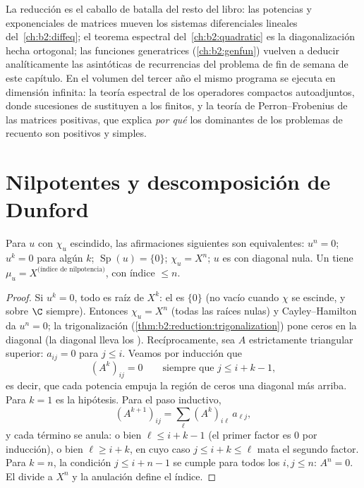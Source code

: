\begin{remark}
La reducción es el caballo de batalla del resto del libro: las
potencias y exponenciales de matrices mueven los sistemas
diferenciales lineales del~\cref{ch:b2:diffeq}; el teorema espectral
del~\cref{ch:b2:quadratic} es la diagonalización hecha ortogonal;
las funciones generatrices (\cref{ch:b2:genfun}) vuelven a deducir
analíticamente las asintóticas de recurrencias del problema de fin
de semana de este capítulo. En el volumen del tercer año el mismo
programa se ejecuta en dimensión infinita: la teoría espectral de
los operadores compactos autoadjuntos, donde sucesiones de
 sustituyen a los  finitos, y la teoría de
Perron--Frobenius de las matrices positivas, que explica \emph{por
qué} los  dominantes de los problemas de recuento
son positivos y simples.
\end{remark}

\section{Nilpotentes y descomposición de Dunford}

\begin{proposition}\label{prop:b2:reduction:nilpotent}
Para $u$ con $\chi_u$ escindido, las afirmaciones siguientes son
equivalentes: $u^n = 0$; $u^k = 0$ para algún $k$;
$\operatorname{Sp}(u) = \{0\}$; $\chi_u = X^n$; $u$ es
 con diagonal nula. Un 
tiene $\mu_u = X^{\text{(índice de nilpotencia)}}$, con índice $\leq
n$.
\end{proposition}

\begin{proof}
Si $u^k = 0$, todo  es raíz de $X^k$: el  es
$\{0\}$ (no vacío cuando $\chi$ se escinde, y sobre $\C$ siempre).
Entonces $\chi_u = X^n$ (todas las raíces nulas) y Cayley--Hamilton
da $u^n = 0$; la trigonalización
(\cref{thm:b2:reduction:trigonalization}) pone ceros en la diagonal
(la diagonal lleva los ). Recíprocamente, sea $A$
estrictamente triangular superior: $a_{ij} = 0$ para $j \leq i$.
Veamos por inducción que
\[
(A^k)_{ij} = 0 \qquad \text{siempre que } j \leq i + k - 1,
\]
es decir, que cada potencia empuja la región de ceros una diagonal
más arriba. Para $k = 1$ es la hipótesis. Para el paso inductivo,
\[
(A^{k+1})_{ij} = \sum_{\ell} (A^k)_{i\ell}\,a_{\ell j} ,
\]
y cada término se anula: o bien $\ell \leq i + k - 1$ (el primer
factor es $0$ por inducción), o bien $\ell \geq i + k$, en cuyo caso
$j \leq i + k \leq \ell$ mata el segundo factor. Para $k = n$, la
condición $j \leq i + n - 1$ se cumple para todos los $i, j \leq n$:
$A^n = 0$. El  divide a $X^n$ y la anulación
define el índice.
\end{proof}

